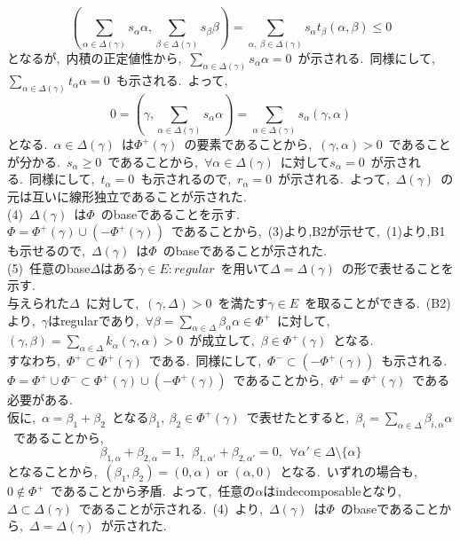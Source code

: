 \documentclass[uplatex,dvipdfmx]{jsarticle}
\begin{document}
\begin{myproof}
\begin{equation*}
        \left(\sum_{\alpha \in \Delta(\gamma)} s_\alpha \alpha, \sum_{\beta \in \Delta(\gamma)} s_\beta \beta\right) = \sum_{\alpha,~\beta \in \Delta(\gamma)} s_\alpha t_\beta (\alpha, \beta) \leq 0
    \end{equation*}
    となるが,~内積の正定値性から,~$\sum_{\alpha \in \Delta(\gamma)} s_\alpha \alpha = 0$~が示される.~同様にして,~$\sum_{\alpha \in \Delta(\gamma)} t_\alpha \alpha = 0$~も示される.~よって,
    \begin{equation*}
        0 = \left( \gamma, \sum_{\alpha \in \Delta(\gamma)} s_\alpha \alpha\right) = \sum_{\alpha \in \Delta(\gamma)} s_\alpha (\gamma, \alpha)
    \end{equation*}
    となる.~$\alpha \in \Delta(\gamma)$~は$\Phi^+(\gamma)$~の要素であることから,~$(\gamma, \alpha) > 0$~であることが分かる.~$s_\alpha \geq 0$~であることから,~$\forall \alpha \in \Delta(\gamma)$~に対して$s_\alpha = 0$~が示される.~同様にして,~$t_\alpha = 0$~も示されるので,~$r_\alpha = 0$~が示される.~よって,~$\Delta(\gamma)$~の元は互いに線形独立であることが示された.\\
    (4)~$\Delta(\gamma)$~は$\Phi$~のbaseであることを示す.\\
    $\Phi = \Phi^+(\gamma) \cup (-\Phi^+(\gamma))$~であることから,~(3)より,B2が示せて,~(1)より,B1も示せるので,~$\Delta(\gamma)$~は$\Phi$~のbaseであることが示された.\\
    (5)~任意のbase$\Delta$はある$\gamma \in E : regular$~を用いて$\Delta = \Delta(\gamma)$~の形で表せることを示す.\\
    与えられた$\Delta$~に対して,~$(\gamma, \Delta) > 0$~を満たす$\gamma \in E$~を取ることができる.~(B2)より,~$\gamma$はregularであり,~$\forall \beta = \sum_{\alpha \in \Delta} \beta_\alpha \alpha \in \Phi^+$~に対して,~$(\gamma, \beta) = \sum_{\alpha \in \Delta} k_\alpha (\gamma, \alpha) > 0$~が成立して,~$\beta \in \Phi^+(\gamma)$~となる.~\\
    すなわち,~$\Phi^+ \subset \Phi^+(\gamma)$~である.~同様にして,~$\Phi^- \subset (-\Phi^+(\gamma))$~も示される.~$\Phi = \Phi^+ \cup \Phi^- \subset \Phi^+(\gamma) \cup (-\Phi^+(\gamma))$~であることから,~$\Phi^+ = \Phi^+(\gamma) $~である必要がある.~\\
    仮に,~$\alpha = \beta_1 + \beta_2$~となる$\beta_1,~\beta_2 \in \Phi^+(\gamma)$~で表せたとすると,~$\beta_i = \sum_{\alpha \in \Delta} \beta_{i,\alpha} \alpha$~であることから,~
    \begin{equation*}
        \beta_{1,\alpha} + \beta_{2,\alpha} = 1,~~\beta_{1,\alpha'} + \beta_{2,\alpha'} = 0,~~\forall \alpha' \in \Delta\setminus \{\alpha\}
    \end{equation*}
    となることから,~$(\beta_1, \beta_2) = (0,\alpha) \text{ or } (\alpha,0)$~となる.~いずれの場合も,~$ 0 \notin \Phi^+$~であることから矛盾.~よって,~任意の$\alpha$はindecomposableとなり,~$\Delta \subset \Delta(\gamma)$~であることが示される.~(4)~より,~$\Delta(\gamma)$~は$\Phi$~のbaseであることから,~$\Delta = \Delta(\gamma)$~が示された.\\
\end{myproof}
\end{document}
